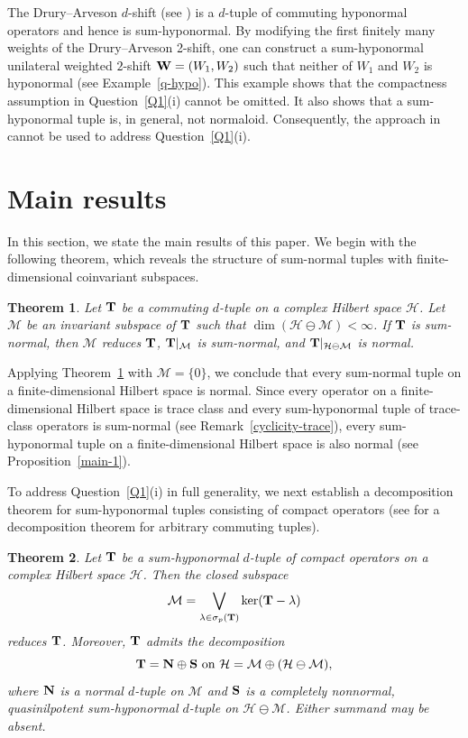\documentclass[10pt, a4paper, oneside, reqno]{amsproc}
\numberwithin{equation}{section}
\newtheorem{theorem}{Theorem}[section]
\theoremstyle{remark}
\theoremstyle{definition}
\begin{document}
The Drury--Arveson $d$-shift (see \cite{H2023}) is a $d$-tuple of commuting hyponormal operators and hence is sum-hyponormal. 
By modifying the first finitely many weights of the Drury--Arveson 2-shift, one can construct a sum-hyponormal unilateral weighted $2$-shift ${\bf W}=(W_1, W_2)$ such that neither of $W_1$ and $W_2$ is hyponormal (see Example~\ref{q-hypo}). This example shows that the compactness assumption in Question~\ref{Q1}(i) cannot be omitted. It also shows that a sum-hyponormal tuple is, in general, not normaloid. Consequently, the approach in \cite{A1963, MP1989, S1962} cannot be used to address Question~\ref{Q1}(i).

\section{Main results}

In this section, we state the main results of this paper. We begin with the following theorem, which reveals the structure of sum-normal tuples with finite-dimensional coinvariant subspaces.
\begin{theorem} \label{main-2}
Let ${\bf T}$ be a commuting $d$-tuple on a complex Hilbert space $\mathcal H$. Let $\mathcal M$ be an invariant subspace of ${\bf T}$ such that $\dim(\mathcal H \ominus \mathcal M) < \infty$.  
If ${\bf T}$ is sum-normal, then
$\mathcal M$ reduces ${\bf T}$, ${\bf T}|_{\mathcal M}$ is sum-normal, and ${\bf T}|_{\mathcal H \ominus \mathcal M}$ is normal.
\end{theorem}

Applying Theorem~\ref{main-2} with $\mathcal M=\{0\}$, we conclude that every sum-normal tuple on a finite-dimensional Hilbert space is normal. Since every operator on a finite-dimensional Hilbert space is trace class and every sum-hyponormal tuple of trace-class operators is sum-normal (see Remark~\ref{cyclicity-trace}), every sum-hyponormal tuple on a finite-dimensional Hilbert space is also normal (see Proposition~\ref{main-1}).

To address Question~\ref{Q1}(i) in full generality, we next establish a decomposition theorem for sum-hyponormal tuples consisting of compact operators (see \cite[Corollary~4.2]{EP2001} for a decomposition theorem for arbitrary commuting tuples).

\begin{theorem} \label{main-4}
Let ${\bf T}$ be a sum-hyponormal $d$-tuple of compact operators on a complex Hilbert space $\mathcal H$. 
Then the closed subspace 
\begin{equation} 
\label{ortho-M}
\mathcal M = 
\bigvee_{{\lambda} \in  \sigma_p({\bf T})}\ker({\bf T}- {\lambda}) 
\end{equation}
reduces ${\bf T}$. Moreover,  
${\bf T}$ admits the decomposition
\begin{equation*}
{\bf T}={\bf N} \oplus {\bf S}~\mbox{on~}\mathcal H = \mathcal M \oplus (\mathcal H \ominus \mathcal M),
\end{equation*}
where ${\bf N}$ is a normal $d$-tuple on $\mathcal M$ and ${\bf S}$ is a completely nonnormal, quasinilpotent sum-hyponormal $d$-tuple on $\mathcal H \ominus \mathcal M$. 
Either summand may be absent.
\end{theorem}
\end{document}
